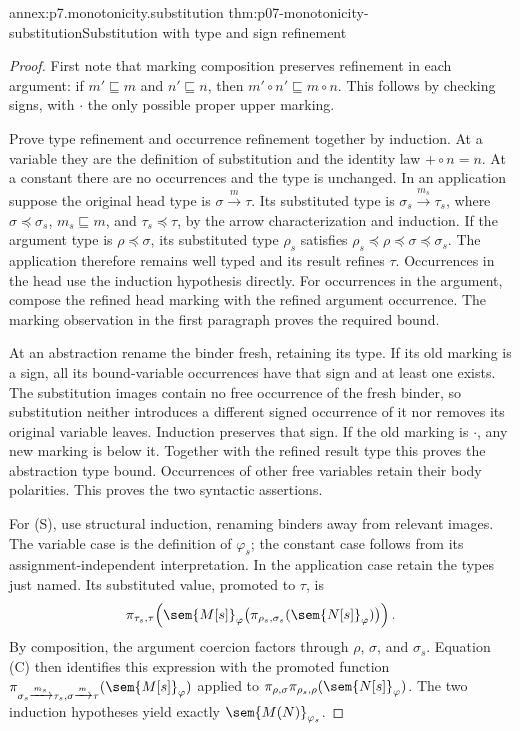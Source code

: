\begin{annexitem}{annex:p7.monotonicity.substitution}
 {thm:p07-monotonicity-substitution}{Substitution with type and sign refinement}
\begin{proof}
First note that marking composition preserves refinement in each argument:
if \(m'\sqsubseteq m\) and \(n'\sqsubseteq n\), then
\(m'\circ n'\sqsubseteq m\circ n\). This follows by checking signs, with
\(\cdot\) the only possible proper upper marking.

Prove type refinement and occurrence refinement together by induction.
At a variable they are the definition of substitution and the identity
law \(+\circ n=n\). At a constant there are no occurrences and the type
is unchanged. In an application suppose the original head type is
\(\sigma\xrightarrow m\tau\). Its substituted type is
\(\sigma_s\xrightarrow{m_s}\tau_s\), where
\(\sigma\preceq\sigma_s\), \(m_s\sqsubseteq m\), and
\(\tau_s\preceq\tau\), by the arrow characterization and induction.
If the argument type is \(\rho\preceq\sigma\), its substituted type
\(\rho_s\) satisfies
\(\rho_s\preceq\rho\preceq\sigma\preceq\sigma_s\).
The application therefore remains well typed and its result refines
\(\tau\). Occurrences in the head use the induction hypothesis directly.
For occurrences in the argument, compose the refined head marking with
the refined argument occurrence. The marking observation in the first
paragraph proves the required bound.

At an abstraction rename the binder fresh, retaining its type.
If its old marking is a sign, all its bound-variable occurrences have that
sign and at least one exists. The substitution images contain no free
occurrence of the fresh binder, so substitution neither introduces a
different signed occurrence of it nor removes its original variable
leaves. Induction preserves that sign. If the old marking is \(\cdot\),
any new marking is below it. Together with the refined result type this
proves the abstraction type bound. Occurrences of other free variables
retain their body polarities. This proves the two syntactic assertions.

For (S), use structural induction, renaming binders away from relevant
images. The variable case is the definition of \(\varphi_s\); the
constant case follows from its assignment-independent interpretation.
In the application case retain the types just named. Its substituted
value, promoted to \(\tau\), is
\[
 \pi_{\tau_s,\tau}\!\left(
  \sem{M[s]}_\varphi
       \bigl(\pi_{\rho_s,\sigma_s}(\sem{N[s]}_\varphi)\bigr)\right).
\]
By composition, the argument coercion factors through
\(\rho\), \(\sigma\), and \(\sigma_s\).
Equation (C) then identifies this expression with the promoted function
\(\pi_{\sigma_s\xrightarrow{m_s}\tau_s,\sigma\xrightarrow m\tau}
   (\sem{M[s]}_\varphi)\)
applied to
\(\pi_{\rho,\sigma}
  \pi_{\rho_s,\rho}(\sem{N[s]}_\varphi)\).
The two induction hypotheses yield exactly
\(\sem{M(N)}_{\varphi_s}\).


\end{proof}
\end{annexitem}
